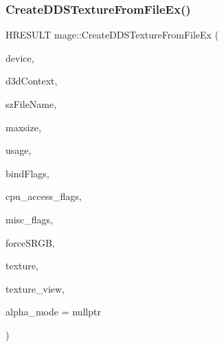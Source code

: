 \subsubsection{\texorpdfstring{Create\+D\+D\+S\+Texture\+From\+File\+Ex()}{CreateDDSTextureFromFileEx()}\hspace{0.1cm}{\footnotesize\ttfamily [2/4]}}
{\footnotesize\ttfamily H\+R\+E\+S\+U\+LT mage\+::\+Create\+D\+D\+S\+Texture\+From\+File\+Ex (\begin{DoxyParamCaption}\item[{\+\_\+\+In\+\_\+ \hyperlink{namespacemage_ae74f374780900893caa5555d1031fd79}{Com\+Ptr}$<$ I\+D3\+D11\+Device2 $>$}]{device,  }\item[{\+\_\+\+In\+\_\+opt\+\_\+ I\+D3\+D11\+Device\+Context $\ast$}]{d3d\+Context,  }\item[{\+\_\+\+In\+\_\+z\+\_\+ const wchar\+\_\+t $\ast$}]{sz\+File\+Name,  }\item[{\+\_\+\+In\+\_\+ size\+\_\+t}]{maxsize,  }\item[{\+\_\+\+In\+\_\+ D3\+D11\+\_\+\+U\+S\+A\+GE}]{usage,  }\item[{\+\_\+\+In\+\_\+ uint32\+\_\+t}]{bind\+Flags,  }\item[{\+\_\+\+In\+\_\+ uint32\+\_\+t}]{cpu\+\_\+access\+\_\+flags,  }\item[{\+\_\+\+In\+\_\+ uint32\+\_\+t}]{misc\+\_\+flags,  }\item[{\+\_\+\+In\+\_\+ bool}]{force\+S\+R\+GB,  }\item[{\+\_\+\+Outptr\+\_\+opt\+\_\+ I\+D3\+D11\+Resource $\ast$$\ast$}]{texture,  }\item[{\+\_\+\+Outptr\+\_\+opt\+\_\+ I\+D3\+D11\+Shader\+Resource\+View $\ast$$\ast$}]{texture\+\_\+view,  }\item[{\+\_\+\+Out\+\_\+opt\+\_\+ \hyperlink{namespacemage_a0c586a2bad862f4858900ca121ca80c2}{D\+D\+S\+\_\+\+A\+L\+P\+H\+A\+\_\+\+M\+O\+DE} $\ast$}]{alpha\+\_\+mode = {\ttfamily nullptr} }\end{DoxyParamCaption})}

\hypertarget{namespacemage_a754e2e797656f47f2cfc1065fcddb470}{}\label{namespacemage_a754e2e797656f47f2cfc1065fcddb470} 
